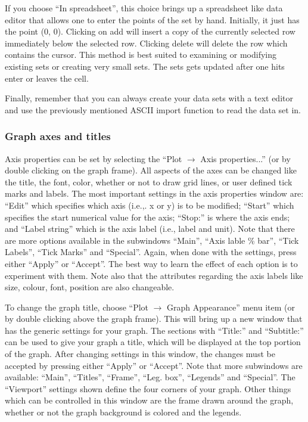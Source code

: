 \documentclass[byrevtex,amssymb,aps,pra,floatfix,letterpaper]{revtex4}
\begin{document}
If you choose ``In spreadsheet'', this choice brings up a spreadsheet like data editor that allows one to enter the points of the set by hand. Initially, it just has the point (0, 0). Clicking on add will insert a copy of the currently selected row immediately below the selected row. Clicking delete will delete the row which contains the cursor. This method is best suited to examining or modifying existing sets or creating very small sets. The sets gets updated after one hits enter or leaves the cell.

Finally, remember that you can always create your data sets with a text editor and use the previously mentioned ASCII import function to read the data set in.

\subsubsection{Graph axes and titles}

Axis properties can be set by selecting the ``Plot $\rightarrow$ Axis properties...'' (or by double clicking on the graph frame). 
All aspects of the axes can be changed like the title, the font, color, whether or not to draw grid lines, or user defined tick marks and labels. The most important settings in the axis properties window are: ``Edit'' which specifies which axis (i.e.,. x or y) is to be modified; ``Start'' which specifies the start numerical value for the axis; ``Stop:'' is where the axis ends; and ``Label string'' which is the axis label (i.e., label and unit). Note that there are more options available in the subwindows ``Main'', ``Axis lable \% bar'', ``Tick Labels'', ``Tick Marks'' and ``Special''. Again, when done with the settings, press either ``Apply'' or ``Accept''. The best way to learn the effect of each option is to experiment with them. Note also that the attributes regarding the axis labels like size, colour, font, position are also changeable.

To change the graph title, choose ``Plot $\rightarrow$ Graph Appearance'' menu item (or by double clicking above the graph frame). This will bring up a new window that has the generic settings for your graph. The sections with ``Title:'' and ``Subtitle:'' can be used to give your graph a title, which will be displayed at the top portion of the graph. After changing settings in this window, the changes must be accepted by pressing either ``Apply'' or ``Accept''. Note that more subwindows are available: ``Main'', ``Titles'', ``Frame'', ``Leg. box'', ``Legends'' and ``Special''. The ``Viewport'' settings shown define the four corners of your graph. Other things which can be controlled in this window are the frame drawn around the graph, whether or not the graph background is colored and the legends. 
\end{document}
